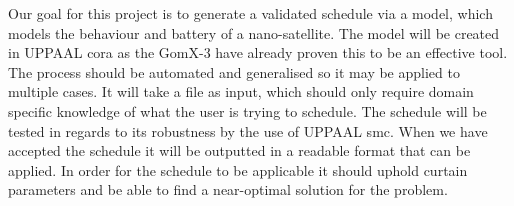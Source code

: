 Our goal for this project is to generate a validated schedule via a model, which models the behaviour and battery of a nano-satellite. The model will be created in UPPAAL \gls{cora} as the GomX-3\cite{gomx3} have already proven this to be an effective tool. The process should be automated and generalised so it may be applied to multiple cases. It will take a file as input, which should only require domain specific knowledge of what the user is trying to schedule. The schedule will be tested in regards to its robustness by the use of UPPAAL \gls{smc}. When we have accepted the schedule it will be outputted in a readable format that can be applied. In order for the schedule to be applicable it should uphold curtain parameters and be able to find a near-optimal solution for the problem.
\glsresetall







